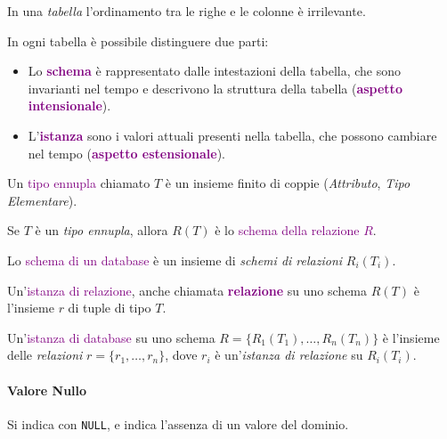 In una \emph{tabella} l'ordinamento tra le righe e le colonne è irrilevante.

In ogni tabella è possibile distinguere due parti:
\begin{itemize}
    \item Lo \textbf{\textcolor{purple}{schema}} è rappresentato dalle intestazioni della tabella, che sono invarianti nel tempo e descrivono la
        struttura della tabella (\textbf{\textcolor{purple}{aspetto intensionale}}).
    \item L'\textbf{\textcolor{purple}{istanza}} sono i valori attuali presenti nella tabella, che
        possono cambiare nel tempo (\textbf{\textcolor{purple}{aspetto estensionale}}).
\end{itemize}

\begin{definition}
    Un \textcolor{purple}{tipo ennupla} chiamato $T$ è un insieme finito di coppie (\emph{Attributo}, \emph{Tipo Elementare}).
\end{definition}

\begin{definition}
    Se $T$ è un \emph{tipo ennupla}, allora $R(T)$ è lo \textcolor{purple}{schema della relazione $R$}.
\end{definition}

\begin{definition}
    Lo \textcolor{purple}{schema di un database} è un insieme di \emph{schemi di relazioni} $R_i(T_i)$.
\end{definition}

\begin{definition}
    Un'\textcolor{purple}{istanza di relazione}, anche chiamata \textbf{\textcolor{purple}{relazione}} su uno
    schema $R(T)$ è l'insieme $r$ di tuple di tipo $T$.
\end{definition}

\begin{definition}
    Un'\textcolor{purple}{istanza di database} su uno schema $R=\{R_1(T_1), \dots, R_n(T_n)\}$
    è l'insieme delle \emph{relazioni} $r=\{r_1, \dots, r_n\}$, dove $r_i$ è un'\emph{istanza di relazione} su $R_i(T_i)$.
\end{definition}

\paragraph{Valore Nullo} Si indica con \verb|NULL|, e indica l'assenza di un valore del dominio.

